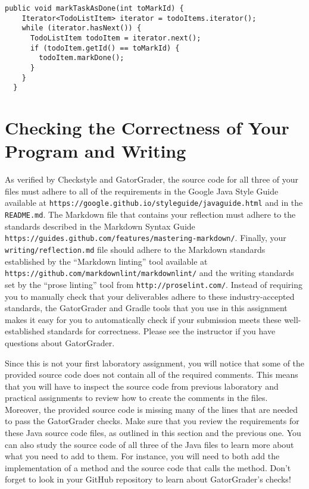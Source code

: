\documentclass[11pt]{article}
\newcommand{\reflection}{\lstinline{writing/reflection.md}}
\newcommand{\readme}{\lstinline{README.md}}
\newcommand{\url}[1]{\lstinline{#1}}
\newcommand{\step}[1]{``{#1}''}
\begin{document}
\vspace{-0.05in}
\begin{verbatim}
public void markTaskAsDone(int toMarkId) {
    Iterator<TodoListItem> iterator = todoItems.iterator();
    while (iterator.hasNext()) {
      TodoListItem todoItem = iterator.next();
      if (todoItem.getId() == toMarkId) {
        todoItem.markDone();
      }
    }
  }
\end{verbatim}

\section*{Checking the Correctness of Your Program and Writing}

As verified by Checkstyle and GatorGrader, the source code for all three of your
files must adhere to all of the requirements in the Google Java Style Guide
available at \url{https://google.github.io/styleguide/javaguide.html} and in the
\readme{}. The Markdown file that contains your reflection must adhere to the
standards described in the Markdown Syntax Guide
\url{https://guides.github.com/features/mastering-markdown/}. Finally, your
\reflection{} file should adhere to the Markdown standards established by the
\step{Markdown linting} tool available at
\url{https://github.com/markdownlint/markdownlint/} and the writing standards
set by the \step{prose linting} tool from \url{http://proselint.com/}. Instead
of requiring you to manually check that your deliverables adhere to these
industry-accepted standards, the GatorGrader and Gradle tools that you use in
this assignment makes it easy for you to automatically check if your submission
meets these well-established standards for correctness. Please see the
instructor if you have questions about GatorGrader.

Since this is not your first laboratory assignment, you will notice that some of
the provided source code does not contain all of the required comments. This
means that you will have to inspect the source code from previous laboratory and
practical assignments to review how to create the comments in the files.
Moreover, the provided source code is missing many of the lines that are needed
to pass the GatorGrader checks. Make sure that you review the requirements for
these Java source code files, as outlined in this section and the previous one.
You can also study the source code of all three of the Java files to learn more
about what you need to add to them. For instance, you will need to both add the
implementation of a method and the source code that calls the method. Don't
forget to look in your GitHub repository to learn about GatorGrader's checks!
\end{document}
